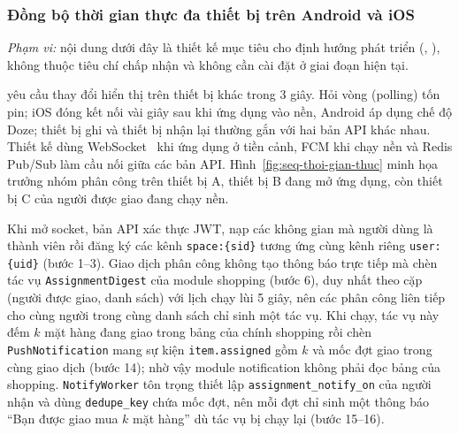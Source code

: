 \subsubsection{Đồng bộ thời gian thực đa thiết bị trên Android và iOS}\label{sssec:kt-thoi-gian-thuc}

\emph{Phạm vi:} nội dung dưới đây là thiết kế mục tiêu cho định hướng phát triển (, ), không thuộc tiêu chí chấp nhận và không cần cài đặt ở giai đoạn hiện tại.

 yêu cầu thay đổi hiển thị trên thiết bị khác trong 3 giây. Hỏi vòng (polling) tốn pin; iOS đóng kết nối vài giây sau khi ứng dụng vào nền, Android áp dụng chế độ Doze; thiết bị ghi và thiết bị nhận lại thường gắn với hai bản API khác nhau. Thiết kế dùng WebSocket~\cite{rfc6455} khi ứng dụng ở tiền cảnh, FCM khi chạy nền và Redis Pub/Sub làm cầu nối giữa các bản API. Hình~\ref{fig:seq-thoi-gian-thuc} minh họa trưởng nhóm phân công trên thiết bị A, thiết bị B đang mở ứng dụng, còn thiết bị C của người được giao đang chạy nền.


Khi mở socket, bản API xác thực JWT, nạp các không gian mà người dùng là thành viên rồi đăng ký các kênh \texttt{space:\{sid\}} tương ứng cùng kênh riêng \texttt{user:\{uid\}} (bước 1--3). Giao dịch phân công không tạo thông báo trực tiếp mà chèn tác vụ \texttt{AssignmentDigest} của module shopping (bước 6), duy nhất theo cặp (người được giao, danh sách) với lịch chạy lùi 5 giây, nên các phân công liên tiếp cho cùng người trong cùng danh sách chỉ sinh một tác vụ. Khi chạy, tác vụ này đếm $k$ mặt hàng đang giao trong bảng của chính shopping rồi chèn \texttt{PushNotification} mang sự kiện \texttt{item.assigned} gồm $k$ và mốc đợt giao trong cùng giao dịch (bước 14); nhờ vậy module notification không phải đọc bảng của shopping. \texttt{NotifyWorker} tôn trọng thiết lập \texttt{assignment\_notify\_on} của người nhận và dùng \texttt{dedupe\_key} chứa mốc đợt, nên mỗi đợt chỉ sinh một thông báo “Bạn được giao mua $k$ mặt hàng” dù tác vụ bị chạy lại (bước 15--16).

